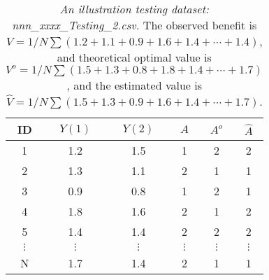 \documentclass[12pt]{article}
\def\hat{\widehat}
\begin{document}
\begin{table}[htbp]
	\centering
	\caption{\emph{An illustration testing dataset: nnn\_xxxx\_Testing\_2.csv.} The observed benefit is $V=1/N \sum (1.2+1.1+0.9+1.6+1.4+\cdots+1.4)$, and theoretical optimal value is $V^o=1/N \sum (1.5+1.3+0.8+1.8+1.4+\cdots+1.7)$, and the estimated value is $\hat{V}=1/N \sum (1.5+1.3+0.9+1.6+1.4+\cdots+1.7)$.}
	\begin{tabular}{c|cc|ccc}
		\hline
		ID &  $Y(1)$    & $Y(2)$    & $A$ & $A^o$ & $\hat{A} $  \\
		\hline
		1& 1.2    & 1.5    &   1& 2 &2 \\
		2& 1.3    & 1.1    &  2 & 1 &1\\
		3& 0.9    & 0.8    &    1 & 2 &1 \\
		4& 1.8    & 1.6    &   2 & 1 &2 \\
		5& 1.4    & 1.4    &  2 & 2 &2 \\
		$\vdots$ &  $\vdots$   & $\vdots$     & $\vdots$     & $\vdots$ &  $\vdots$    \\
		N & 1.7    & 1.4    &   2 & 1 &1\\
		\hline
		\hline
	\end{tabular}%
	\label{tab:TestingDataExample3}%
\end{table}
\end{document}
